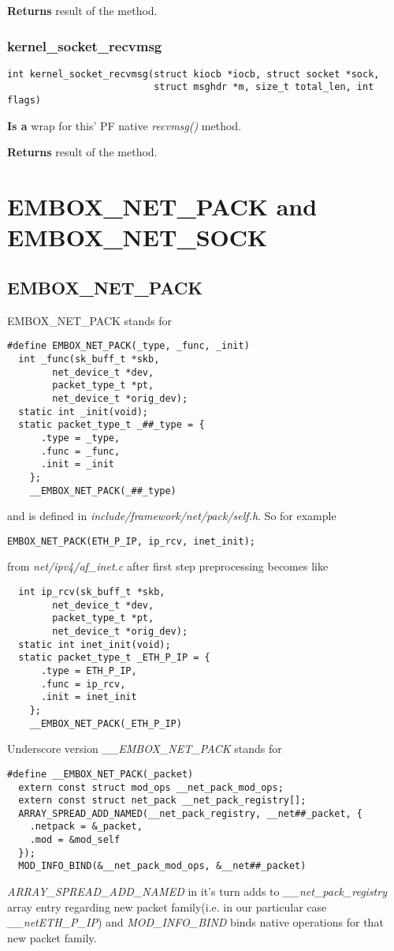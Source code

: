 \documentclass[12pt,a4paper]{article}
\begin{document}
{\bf Returns} result of the method.


\subsubsection{kernel\_socket\_recvmsg}
\label{sec:kernel_socket_kernel_socket_recvmsg}
\begin{verbatim}
int kernel_socket_recvmsg(struct kiocb *iocb, struct socket *sock,
                          struct msghdr *m, size_t total_len, int flags)
\end{verbatim}
{\bf Is a} wrap for this' PF native {\it recvmsg()} method.

{\bf Returns} result of the method.

\newpage
\section {EMBOX\_NET\_PACK and EMBOX\_NET\_SOCK}
\label{sec:embox_net_pack_and_sock}
\subsection{EMBOX\_NET\_PACK}
\label{sec:embox_net_pack}
EMBOX\_NET\_PACK stands for
\begin{verbatim}
#define EMBOX_NET_PACK(_type, _func, _init)
  int _func(sk_buff_t *skb,
        net_device_t *dev,
        packet_type_t *pt,
        net_device_t *orig_dev);
  static int _init(void);
  static packet_type_t _##_type = {
      .type = _type,
      .func = _func,
      .init = _init
    };
    __EMBOX_NET_PACK(_##_type)
\end{verbatim}
and is defined in {\it include/framework/net/pack/self.h}. So for example
\begin{verbatim}
EMBOX_NET_PACK(ETH_P_IP, ip_rcv, inet_init);
\end{verbatim}
from {\it net/ipv4/af\_inet.c} after first step preprocessing becomes like
\begin{verbatim}
  int ip_rcv(sk_buff_t *skb,
        net_device_t *dev,
        packet_type_t *pt,
        net_device_t *orig_dev);
  static int inet_init(void);
  static packet_type_t _ETH_P_IP = {
      .type = ETH_P_IP,
      .func = ip_rcv,
      .init = inet_init
    };
    __EMBOX_NET_PACK(_ETH_P_IP)
\end{verbatim}
Underscore version {\it \_\_EMBOX\_NET\_PACK} stands for
\begin{verbatim}
#define __EMBOX_NET_PACK(_packet)
  extern const struct mod_ops __net_pack_mod_ops;
  extern const struct net_pack __net_pack_registry[];
  ARRAY_SPREAD_ADD_NAMED(__net_pack_registry, __net##_packet, {
    .netpack = &_packet,
    .mod = &mod_self
  });
  MOD_INFO_BIND(&__net_pack_mod_ops, &__net##_packet)
\end{verbatim}
{\it ARRAY\_SPREAD\_ADD\_NAMED} in it's turn adds to
{\it \_\_net\_pack\_registry} array entry regarding new packet family(i.e. in
our particular case {\it \_\_netETH\_P\_IP}) and {\it MOD\_INFO\_BIND}
binds native operations for that new packet family.
\end{document}
